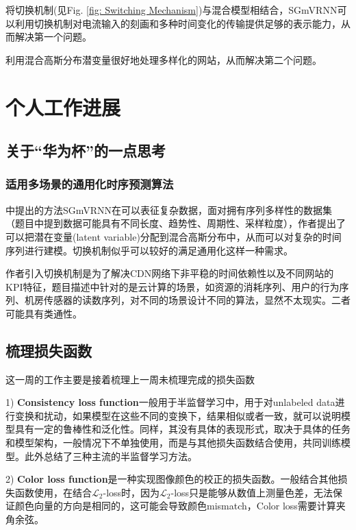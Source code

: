 \documentclass[letterpaper,12pt]{article}
\begin{document}
	将切换机制(见Fig. \ref{fig: Switching Mechanism})与混合模型相结合，SGmVRNN可以利用切换机制对电流输入的刻画和多种时间变化的传输提供足够的表示能力，从而解决第一个问题。
	
	利用混合高斯分布潜变量很好地处理多样化的网站，从而解决第二个问题。
	
	\section{个人工作进展}
	
	\subsection{关于“华为杯”的一点思考}
	
	\subsubsection{适用多场景的通用化时序预测算法}
	
	\cite{dai2022switching}中提出的方法SGmVRNN在可以表征复杂数据，面对拥有序列多样性的数据集（题目中提到数据可能具有不同长度、趋势性、周期性、采样粒度），作者提出了可以把潜在变量(latent variable)分配到混合高斯分布中，从而可以对复杂的时间序列进行建模。切换机制似乎可以较好的满足通用化这样一种需求。
	
	作者引入切换机制是为了解决CDN网络下非平稳的时间依赖性以及不同网站的KPI特征，题目描述中针对的是云计算的场景，如资源的消耗序列、用户的行为序列、机房传感器的读数序列，对不同的场景设计不同的算法，显然不太现实。二者可能具有类通性。
	
	\subsection{梳理损失函数}
	
	这一周的工作主要是接着梳理上一周未梳理完成的损失函数
	
	1) \textbf{Consistency loss function}一般用于半监督学习中，用于对unlabeled data进行变换和扰动，如果模型在这些不同的变换下，结果相似或者一致，就可以说明模型具有一定的鲁棒性和泛化性。同样，其没有具体的表现形式，取决于具体的任务和模型架构，一般情况下不单独使用，而是与其他损失函数结合使用，共同训练模型。此外总结了三种主流的半监督学习方法。
	
	2) \textbf{Color loss function}是一种实现图像颜色的校正的损失函数。一般结合其他损失函数使用，在结合$\mathcal{L}_2$-loss时，因为$\mathcal{L}_2$-loss只是能够从数值上测量色差，无法保证颜色向量的方向是相同的，这可能会导致颜色mismatch，Color loss需要计算夹角余弦。
	
\end{document}
